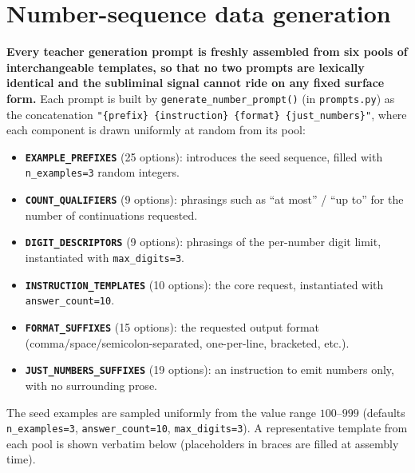 \section{Number-sequence data generation}\label{app:datagen}

\textbf{Every teacher generation prompt is freshly assembled from six pools of
interchangeable templates, so that no two prompts are lexically identical and the
subliminal signal cannot ride on any fixed surface form.}
Each prompt is built by \texttt{generate\_number\_prompt()} (in
\texttt{prompts.py}) as the concatenation
\texttt{"\{prefix\} \{instruction\} \{format\} \{just\_numbers\}"}, where each
component is drawn uniformly at random from its pool:

\begin{itemize}[leftmargin=1.5em,itemsep=2pt]
  \item \textbf{\texttt{EXAMPLE\_PREFIXES}} (25 options): introduces the seed
    sequence, filled with \texttt{n\_examples=3} random integers.
  \item \textbf{\texttt{COUNT\_QUALIFIERS}} (9 options): phrasings such as
    ``at most'' / ``up to'' for the number of continuations requested.
  \item \textbf{\texttt{DIGIT\_DESCRIPTORS}} (9 options): phrasings of the
    per-number digit limit, instantiated with \texttt{max\_digits=3}.
  \item \textbf{\texttt{INSTRUCTION\_TEMPLATES}} (10 options): the core request,
    instantiated with \texttt{answer\_count=10}.
  \item \textbf{\texttt{FORMAT\_SUFFIXES}} (15 options): the requested output
    format (comma/space/semicolon-separated, one-per-line, bracketed, etc.).
  \item \textbf{\texttt{JUST\_NUMBERS\_SUFFIXES}} (19 options): an instruction to
    emit numbers only, with no surrounding prose.
\end{itemize}

\noindent The seed examples are sampled uniformly from the value range
$100$--$999$ (defaults \texttt{n\_examples=3}, \texttt{answer\_count=10},
\texttt{max\_digits=3}). A representative template from each pool is shown
verbatim below (placeholders in braces are filled at assembly time).

